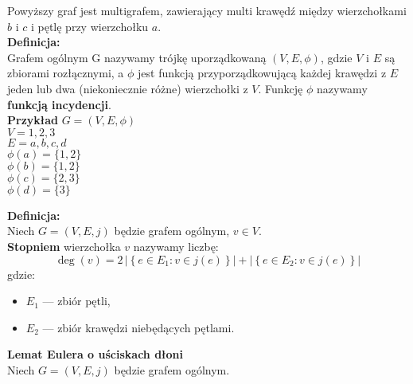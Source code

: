 \documentclass{article}
\begin{document}
\newpage

\begin{center}
\end{center}
Powyższy graf jest multigrafem, zawierający multi krawędź między wierzchołkami $b$ i $c$ i pętlę przy wierzchołku $a$. \\
\textbf{Definicja:}\\
Grafem ogólnym G nazywamy trójkę uporządkowaną $(V, E, \phi)$, gdzie $V$ i $E$ są zbiorami rozłącznymi, a $\phi$ jest funkcją przyporządkowującą każdej krawędzi z $E$ jeden lub dwa (niekoniecznie różne) wierzchołki z $V$. Funkcję $\phi$ nazywamy \textbf{funkcją incydencji}. \\
\textbf{Przykład}
$G = (V, E, \phi)$ \\
$V = {1, 2, 3}$ \\
$E = {a, b, c, d}$ \\
$\phi(a) = \{1, 2\}$ \\
$\phi(b) = \{1, 2\}$ \\
$\phi(c) = \{2, 3\}$ \\
$\phi(d) = \{3\}$ \\ %
\begin{center}
\end{center}
\textbf{Definicja:}\\
Niech $G = (V, E, j)$ będzie grafem ogólnym, $v \in V$.\\
\textbf{Stopniem} wierzchołka $v$ nazywamy liczbę:
\[
\deg(v) = 2\, \left| \left\{ e \in E_{1} : v \in j(e) \right\} \right| + \left| \left\{ e \in E_{2} : v \in j(e) \right\} \right|
\]
gdzie:
\begin{itemize}
    \item $E_{1}$ --- zbiór pętli,
    \item $E_{2}$ --- zbiór krawędzi niebędących pętlami.
\end{itemize}
\newpage
\textbf{Lemat Eulera o uściskach dłoni}\\
Niech $G = (V, E, j)$ będzie grafem ogólnym.
\end{document}
